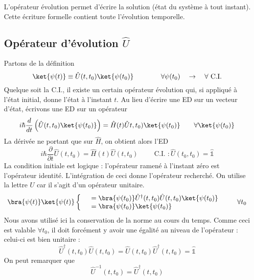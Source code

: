 	L'opérateur évolution  permet d'écrire la solution (état du système à tout instant). Cette 
	écriture formelle contient toute l'évolution temporelle. 

	\subsection{Opérateur d'évolution $\hat{U}$}
	Partons de la définition
	\begin{equation}
	\ket{\psi(t)} \equiv \hat{U}(t,t_0)\ket{\psi(t_0)}\qquad\qquad\forall \psi(t_0)\quad\rightarrow\quad 
	\forall \text{ C.I.}
	\end{equation}
	Quelque soit la C.I., il existe un certain opérateur évolution qui, si appliqué à l'état initial, 
	donne l'état à l'instant $t$. Au lieu d'écrire une ED sur un vecteur d'état, écrivons une ED 
	sur un opérateur
	\begin{equation}
	i\hbar \dfrac{d}{dt}\left(\hat{U}(t,t_0)\ket{\psi(t_0)}\right) = \hat{H}(t)\hat{U}t,t_0)\ket{\psi(t_0)}
	\qquad \forall \ket{\psi(t_0)}
	\end{equation}
	La dérivée ne portant que sur $\hat{H}$, on obtient alors l'ED
	\begin{equation}
	i\hbar \dfrac{\partial}{\partial t}\hat{U}(t,t_0) = \hat{H}(t)\hat{U}(t,t_0)\qquad \text{ C.I. } : 
	\hat{U}(t_0,t_0) = \hat{\mathbb{1}}
	\end{equation}
	La condition initiale est logique : l'opérateur ramené à l'instant zéro est l'opérateur identité.
	L'intégration de ceci donne l'opérateur recherché. On utilise la lettre $U$ car il s'agit d'un 
	opérateur unitaire. 
	\begin{equation}
	\bra{\psi(t)}\ket{\psi(t)}\left\{\begin{array}{ll}
	&= \bra{\psi(t_0)}\hat{U}^\dagger(t,t_0)\hat{U}(t,t_0)\ket{\psi(t_0)}\\
	&= \bra{\psi(t_0)}\ket{\psi(t_0)}
	\end{array}\right. \qquad\forall t_0
	\end{equation}
	Nous avons utilisé ici la conservation de la norme au cours du temps. Comme ceci est valable 
	$\forall t_0$, il doit forcément y avoir une égalité au niveau de l'opérateur : celui-ci 
	est bien unitaire :
	\begin{equation}
	\hat{U}^\dagger(t,t_0)\hat{U}(t,t_0) = \hat{U}(t,t_0)\hat{U}^\dagger(t,t_0) = \hat{\mathbb{1}}
	\end{equation}
	On peut remarquer que
	\begin{equation}
	\hat{U}^{-1}(t,t_0) = \hat{U}^\dagger(t,t_0)
	\end{equation}
